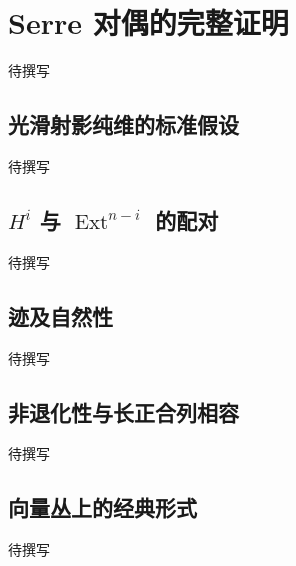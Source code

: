 
% 
% 

\section{Serre 对偶的完整证明}
\label{g5:sec:2203}

待撰写

\subsection{光滑射影纯维的标准假设}
\label{g5:subsec:2203:01}
待撰写

\subsection{\texorpdfstring{\(H^i\) 与 \(\operatorname{Ext}^{n-i}\) 的配对}{Hⁱ 与 Extⁿ⁻ⁱ 的配对}}
\label{g5:subsec:2203:02}
待撰写

\subsection{迹及自然性}
\label{g5:subsec:2203:03}
待撰写

\subsection{非退化性与长正合列相容}
\label{g5:subsec:2203:04}
待撰写

\subsection{向量丛上的经典形式}
\label{g5:subsec:2203:05}
待撰写
